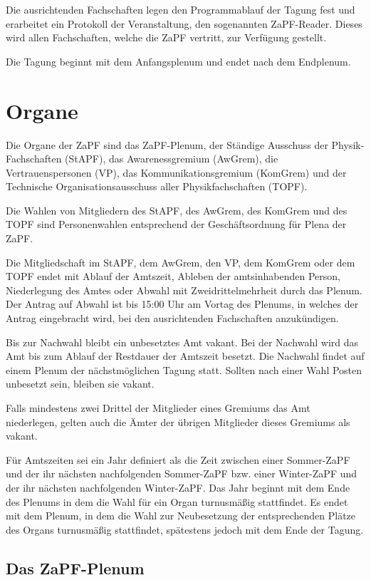 \documentclass[
  a4paper,
  oneside]{scrartcl}
\begin{document}
Die ausrichtenden Fachschaften legen den Programmablauf der Tagung fest
und erarbeitet ein Protokoll der Veranstaltung, den sogenannten
ZaPF-Reader. Dieses wird allen Fachschaften, welche die ZaPF vertritt,
zur Verfügung gestellt.

Die Tagung beginnt mit dem Anfangsplenum und endet nach dem Endplenum.

\section{Organe}\label{organe}

Die Organe der ZaPF sind das ZaPF-Plenum, der Ständige Ausschuss der
Physik-Fachschaften (StAPF), das Awarenessgremium (AwGrem), die
Vertrauenspersonen (VP), das Kommunikationsgremium (KomGrem) und der
Technische Organisationsausschuss aller Physikfachschaften (TOPF).

Die Wahlen von Mitgliedern des StAPF, des AwGrem, des KomGrem und des
TOPF sind Personenwahlen entsprechend der Geschäftsordnung für Plena der
ZaPF.

Die Mitgliedschaft im StAPF, dem AwGrem, den VP, dem KomGrem oder dem
TOPF endet mit Ablauf der Amtszeit, Ableben der amtsinhabenden Person,
Niederlegung des Amtes oder Abwahl mit Zweidrittelmehrheit durch das
Plenum. Der Antrag auf Abwahl ist bis 15:00 Uhr am Vortag des Plenums,
in welches der Antrag eingebracht wird, bei den ausrichtenden
Fachschaften anzukündigen.

Bis zur Nachwahl bleibt ein unbesetztes Amt vakant. Bei der Nachwahl
wird das Amt bis zum Ablauf der Restdauer der Amtszeit besetzt. Die
Nachwahl findet auf einem Plenum der nächstmöglichen Tagung statt.
Sollten nach einer Wahl Posten unbesetzt sein, bleiben sie vakant.

Falls mindestens zwei Drittel der Mitglieder eines Gremiums das Amt
niederlegen, gelten auch die Ämter der übrigen Mitglieder dieses
Gremiums als vakant.

Für Amtszeiten sei ein Jahr definiert als die Zeit zwischen einer
Sommer-ZaPF und der ihr nächsten nachfolgenden Sommer-ZaPF bzw. einer
Winter-ZaPF und der ihr nächsten nachfolgenden Winter-ZaPF. Das Jahr
beginnt mit dem Ende des Plenums in dem die Wahl für ein Organ
turnusmäßig stattfindet. Es endet mit dem Plenum, in dem die Wahl zur
Neubesetzung der entsprechenden Plätze des Organs turnusmäßig
stattfindet, spätestens jedoch mit dem Ende der Tagung.

\subsection{Das ZaPF-Plenum}\label{das-zapf-plenum}
\end{document}
